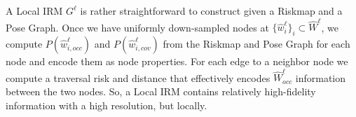 \documentclass[letterpaper]{article} %
\newcommand{\phdone}[1]{} %
\begin{document}
\phdone{Local IRM}
%
A Local IRM $G^\ell$ is rather straightforward to construct given a Riskmap and a Pose Graph.
Once we have uniformly down-sampled nodes at $\{\hat{w}^\ell_i\}_i \subset \hat{W}^\ell$,
we compute $P(\hat{w}^\ell_{i,occ})$ and $P(\hat{w}^\ell_{i,cov})$ from the Riskmap and Pose Graph for each node and encode them as node properties.
For each edge to a neighbor node we compute a traversal risk and distance that effectively encodes $\hat{W}^\ell_{occ}$ information between the two nodes.
So, a Local IRM contains relatively high-fidelity information with a high resolution, but locally.







\end{document}
